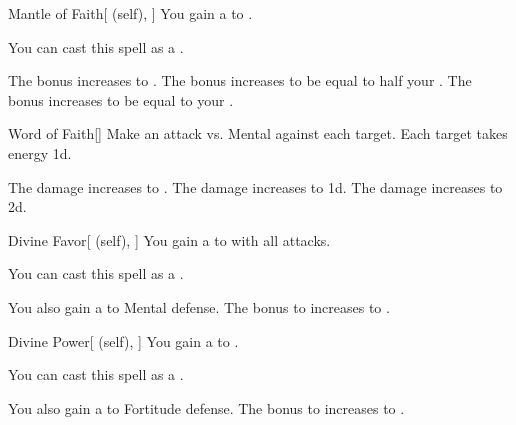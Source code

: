 \lowercase{\hypertarget{spell:Mantle of Faith}{}}\label{spell:Mantle of Faith}
\begin{attuneability}[Rank 1]{\hypertarget{spell:Mantle of Faith}{Mantle of Faith}}[ (self), ]
You gain a   to .

You can cast this spell as a .

\rankline
{} The bonus increases to .
 The bonus increases to be equal to half your .
 The bonus increases to be equal to your .
\end{attuneability}
\vspace{0.25em}



\lowercase{\hypertarget{spell:Word of Faith}{}}\label{spell:Word of Faith}
\begin{freeability}[Rank 1]{\hypertarget{spell:Word of Faith}{Word of Faith}}[]
Make an attack vs. Mental against each target.
\hit Each target takes energy  \minus1d.

\rankline
{} The damage increases to .
 The damage increases to  \plus1d.
 The damage increases to  \plus2d.
\end{freeability}
\vspace{0.25em}



\lowercase{\hypertarget{spell:Divine Favor}{}}\label{spell:Divine Favor}
\begin{attuneability}[Rank 3]{\hypertarget{spell:Divine Favor}{Divine Favor}}[ (self), ]
You gain a   to  with all attacks.

You can cast this spell as a .

\rankline
{} You also gain a   to Mental defense.
 The bonus to  increases to .
\end{attuneability}
\vspace{0.25em}



\lowercase{\hypertarget{spell:Divine Power}{}}\label{spell:Divine Power}
\begin{attuneability}[Rank 3]{\hypertarget{spell:Divine Power}{Divine Power}}[ (self), ]
You gain a   to .

You can cast this spell as a .

\rankline
{} You also gain a   to Fortitude defense.
 The bonus to  increases to .
\end{attuneability}
\vspace{0.25em}



